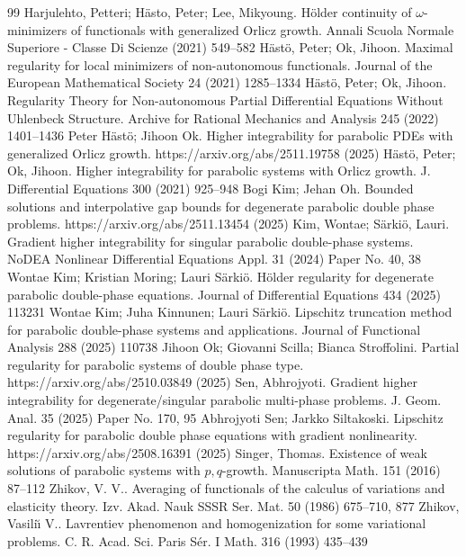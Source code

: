 \documentclass[10pt,a4paper]{amsart}
\numberwithin{equation}{section}
\begin{document}
\begin{thebibliography}{99}
 Harjulehto, Petteri; Hästo, Peter; Lee, Mikyoung. Hölder continuity of $\omega$-minimizers of functionals with generalized Orlicz growth. Annali Scuola Normale Superiore - Classe Di Scienze (2021) 549–582
 Hästö, Peter; Ok, Jihoon. Maximal regularity for local minimizers of non-autonomous functionals. Journal of the European Mathematical Society 24 (2021) 1285–1334
 Hästö, Peter; Ok, Jihoon. Regularity Theory for Non-autonomous Partial Differential Equations Without Uhlenbeck Structure. Archive for Rational Mechanics and Analysis 245 (2022) 1401–1436
 Peter Hästö; Jihoon Ok. Higher integrability for parabolic PDEs with generalized Orlicz growth. https://arxiv.org/abs/2511.19758 (2025)
 H\"{a}st\"{o}, Peter; Ok, Jihoon. Higher integrability for parabolic systems with {O}rlicz growth. J. Differential Equations 300 (2021) 925--948
 Bogi Kim; Jehan Oh. Bounded solutions and interpolative gap bounds for degenerate parabolic double phase problems. https://arxiv.org/abs/2511.13454 (2025)
 Kim, Wontae; S\"arki\"o, Lauri. Gradient higher integrability for singular parabolic double-phase systems. NoDEA Nonlinear Differential Equations Appl. 31 (2024) Paper No. 40, 38
 Wontae Kim; Kristian Moring; Lauri Särkiö. Hölder regularity for degenerate parabolic double-phase equations. Journal of Differential Equations 434 (2025) 113231
 Wontae Kim; Juha Kinnunen; Lauri Särkiö. Lipschitz truncation method for parabolic double-phase systems and applications. Journal of Functional Analysis 288 (2025) 110738
 Jihoon Ok; Giovanni Scilla; Bianca Stroffolini. Partial regularity for parabolic systems of double phase type. https://arxiv.org/abs/2510.03849 (2025)
 Sen, Abhrojyoti. Gradient higher integrability for degenerate/singular parabolic multi-phase problems. J. Geom. Anal. 35 (2025) Paper No. 170, 95
 Abhrojyoti Sen; Jarkko Siltakoski. Lipschitz regularity for parabolic double phase equations with gradient nonlinearity. https://arxiv.org/abs/2508.16391 (2025)
 Singer, Thomas. Existence of weak solutions of parabolic systems with {$p, q$}-growth. Manuscripta Math. 151 (2016) 87--112
 Zhikov, V. V.. Averaging of functionals of the calculus of variations and elasticity theory. Izv. Akad. Nauk SSSR Ser. Mat. 50 (1986) 675--710, 877
 Zhikov, Vasili\u{\i} V.. Lavrentiev phenomenon and homogenization for some variational problems. C. R. Acad. Sci. Paris S\'{e}r. I Math. 316 (1993) 435--439

\end{thebibliography}
\end{document}
